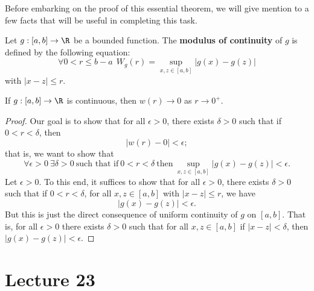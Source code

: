 Before embarking on the proof of this essential theorem, we will give mention to a few facts that will be useful in completing this task. 

\begin{definition}
    Let \( g: [a,b] \to \R  \) be a bounded function. The \textbf{modulus of continuity} of \( g  \) is defined by the following equation:
    \[  \forall 0 < r \leq b - a \ \ {W}_{g}(r) = \sup_{x,z \in [a,b]} | g(x) - g(z) |  \]
    with \( | x - z  |  \leq r  \).
\end{definition}


\begin{prop}[Fact 1]\label{Fact 1}
    If \( g:[a,b] \to \R  \) is continuous, then \( w(r) \to 0  \) as \( r \to 0^{+}  \). 
\end{prop}
\begin{proof}
Our goal is to show that for all \( \epsilon > 0  \), there exists \( \delta > 0  \) such that if \( 0 < r < \delta  \), then 
\[  | w(r) - 0  |  < \epsilon; \]
that is, we want to show that 
\[  \forall \epsilon > 0 \ \exists \delta > 0 \ \text{such that if} \ 0 < r < \delta \ \text{then} \ \sup_{x,z \in [a,b]} | g(x) - g(z) |  < \epsilon. \]
Let \( \epsilon > 0 \). To this end, it suffices to show that for all \( \epsilon > 0  \), there exists \( \delta > 0  \) such that if \( 0 < r < \delta  \), for all \( x,z \in [a,b] \) with \( | x - z  |  \leq r  \), we have  
\[  |g(x) - g(z)|  < \epsilon. \]
But this is just the direct consequence of uniform continuity of \( g  \) on \( [a,b] \). That is, for all \( \epsilon > 0  \) there exists \( \delta > 0  \) such that for all \( x,z \in [a,b] \) if \( |  x - z  |  < \delta  \), then \( | g(x) - g(z) |  < \epsilon \). 
\end{proof}


\section{Lecture 23}

